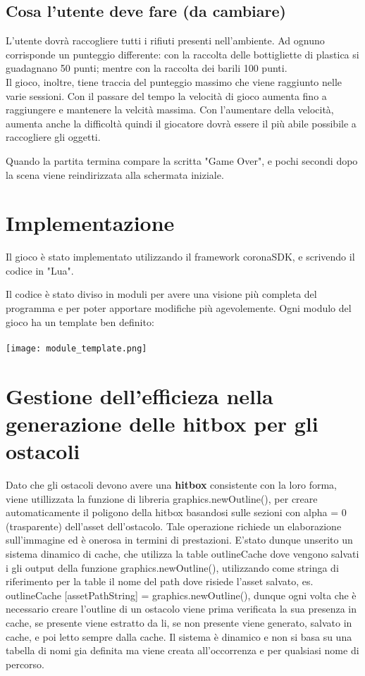 \documentclass[12pt]{article}
\begin{document}
\subsection{Cosa l'utente deve fare (da cambiare)}
 
L'utente dovrà raccogliere tutti i rifiuti presenti nell'ambiente. Ad ognuno corrisponde un punteggio differente: con la raccolta delle bottigliette di plastica si guadagnano 50 punti; mentre con la raccolta dei barili 100 punti. 
\\Il gioco, inoltre, tiene traccia del punteggio massimo che viene raggiunto nelle varie sessioni.
Con il passare del tempo la velocità di gioco aumenta fino a raggiungere e mantenere la velcità massima. Con l'aumentare della velocità, aumenta anche la difficoltà quindi il giocatore dovrà essere il più abile possibile a raccogliere gli oggetti. 


Quando la partita termina compare la scritta "Game Over", e pochi secondi dopo la scena viene reindirizzata alla schermata iniziale. 

\section{Implementazione}
Il gioco è stato implementato utilizzando il framework coronaSDK, e scrivendo il codice in "Lua". 


Il codice è stato diviso in moduli per avere una visione più completa del programma e per poter apportare modifiche più agevolemente. 
Ogni modulo del gioco ha un template ben definito:
\\\\


\texttt{[image: module\_template.png]}\\

\section{Gestione dell’efficieza nella generazione delle hitbox
per gli ostacoli}

Dato che gli ostacoli devono avere una \textbf{hitbox} consistente con la loro forma, viene utillizzata la funzione di libreria 
graphics.newOutline(), per creare automaticamente il poligono della hitbox basandosi sulle sezioni con alpha = 0 (trasparente) 
dell’asset dell’ostacolo.
Tale operazione richiede un elaborazione sull’immagine ed è onerosa in termini di prestazioni. E'stato dunque unserito un sistema 
dinamico di cache, che utilizza la table outlineCache dove vengono salvati i gli output della funzione graphics.newOutline(), 
utilizzando come stringa di riferimento per la table il nome del path dove risiede l’asset salvato, es. outlineCache [assetPathString] = graphics.newOutline(), 
dunque ogni volta che è necessario creare l’outline di un ostacolo viene prima verificata la sua presenza in cache, se presente viene 
estratto da li, se non presente viene generato, salvato in cache, e poi letto sempre dalla cache. Il sistema è dinamico e non si basa 
su una tabella di nomi gia definita ma viene creata all’occorrenza e per qualsiasi nome di percorso.
\end{document}
